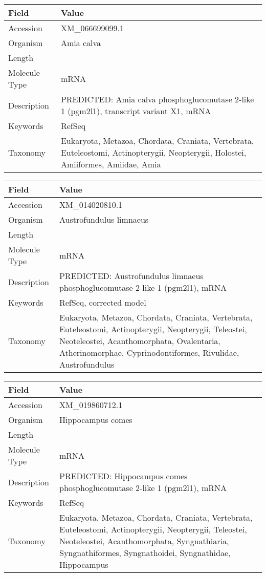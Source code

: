 \documentclass[10pt]{article}
\begin{document}
\vspace{1em}
{\footnotesize
\begin{longtable}{>{\raggedright\arraybackslash}p{4.5cm} >{\raggedright\arraybackslash}p{11.5cm}}
\textbf{Field} & \textbf{Value} \\
\hline
Accession & XM\_066699099.1 \\
Organism & Amia calva \\
Length & 6823 \\
Molecule Type & mRNA \\
Description & PREDICTED: Amia calva phosphoglucomutase 2-like 1 (pgm2l1), transcript variant X1, mRNA \\
Keywords & RefSeq \\
Taxonomy & Eukaryota, Metazoa, Chordata, Craniata, Vertebrata, Euteleostomi, Actinopterygii, Neopterygii, Holostei, Amiiformes, Amiidae, Amia \\
\end{longtable}
}

\vspace{1em}
{\footnotesize
\begin{longtable}{>{\raggedright\arraybackslash}p{4.5cm} >{\raggedright\arraybackslash}p{11.5cm}}
\textbf{Field} & \textbf{Value} \\
\hline
Accession & XM\_014020810.1 \\
Organism & Austrofundulus limnaeus \\
Length & 2242 \\
Molecule Type & mRNA \\
Description & PREDICTED: Austrofundulus limnaeus phosphoglucomutase 2-like 1 (pgm2l1), mRNA \\
Keywords & RefSeq, corrected model \\
Taxonomy & Eukaryota, Metazoa, Chordata, Craniata, Vertebrata, Euteleostomi, Actinopterygii, Neopterygii, Teleostei, Neoteleostei, Acanthomorphata, Ovalentaria, Atherinomorphae, Cyprinodontiformes, Rivulidae, Austrofundulus \\
\end{longtable}
}

\vspace{1em}
{\footnotesize
\begin{longtable}{>{\raggedright\arraybackslash}p{4.5cm} >{\raggedright\arraybackslash}p{11.5cm}}
\textbf{Field} & \textbf{Value} \\
\hline
Accession & XM\_019860712.1 \\
Organism & Hippocampus comes \\
Length & 2263 \\
Molecule Type & mRNA \\
Description & PREDICTED: Hippocampus comes phosphoglucomutase 2-like 1 (pgm2l1), mRNA \\
Keywords & RefSeq \\
Taxonomy & Eukaryota, Metazoa, Chordata, Craniata, Vertebrata, Euteleostomi, Actinopterygii, Neopterygii, Teleostei, Neoteleostei, Acanthomorphata, Syngnathiaria, Syngnathiformes, Syngnathoidei, Syngnathidae, Hippocampus \\
\end{longtable}
}
\end{document}
